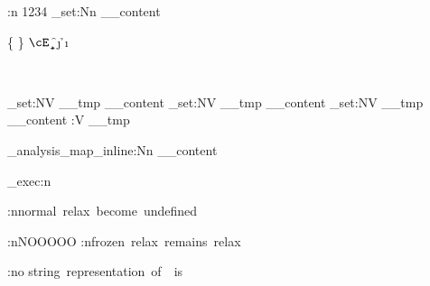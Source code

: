 \documentclass[12pt]{article}
\begin{document}
\ExplSyntaxOn
\pretty:n {1234}
\tl_set:Nn \__content {
	\cFrozenRelax
	\relax

	\cB \a \cE \z
	\cB \{ \cE \}
	\cB \( \cE \)
	\cM \b
	\cT \c
	\cP \d
	\cU \e
	\cD \f
	\cS \j
	\cL \g
	\cO \h
	\cA \i \cA {\~\ }
	
	\cM \  %
	\cT \  %
	\cP \  %
	\cU \  %
	\cD \  %
	\cS \  %
	\cL \  %
	\cO \  %
}

\benchmark{--}
\precattl_set:NV \__tmp \__content
\precattl_set:NV \__tmp \__content
\precattl_set:NV \__tmp \__content
\pretty:V \__tmp


\benchmark{--}
\tl_analysis_map_inline:Nn \__content {}

\precattl_exec:n {
	\begingroup
	\let\relax\undefined

	\ifx \relax \undefined
		\pretty:n{normal~relax~become~undefined}
	\fi

	\ifx \cFrozenRelax \undefined
		\pretty:n{NOOOOO}
	\else
		\pretty:n{frozen~relax~remains~relax}
	\fi
	\endgroup

	\pretty:no {string~representation~of~\cFrozenRelax~is~}
		{\string\cFrozenRelax}
}

\ExplSyntaxOff
\end{document}
